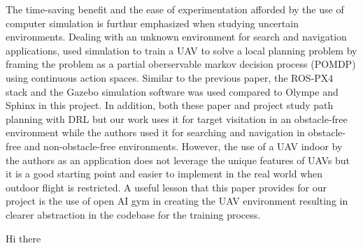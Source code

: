 \documentclass[../main.tex]{subfiles}
\begin{document}

The time-saving benefit and the ease of experimentation 
afforded by the use of computer simulation is furthur emphasized 
when studying uncertain environments.
Dealing with an unknown environment for search and navigation applications,
\citeauthor{Wal19} used simulation to train a UAV 
to solve a local planning problem
by framing the problem as a 
partial oberservable markov decision process (POMDP)
using continuous action spaces.
Similar to the previous paper, the ROS-PX4 stack and the Gazebo 
simulation software was used compared to Olympe and Sphinx 
in this project.
In addition, both these paper and project study path planning 
with DRL but our work uses it for target visitation 
in an obstacle-free environment 
while the authors used it for searching and navigation
in obstacle-free and non-obstacle-free environments.
However, the use of a UAV indoor by the authors as an application 
does not leverage the unique features of UAVs 
but it is a good starting point 
and easier to implement in the real world 
when outdoor flight is restricted.
A useful lesson that this paper provides for our project
is the use of open AI gym in creating the UAV environment
resulting in clearer abstraction in the codebase
for the training process.

Hi there \cite{Gar20}



\blindtext
\end{document}
